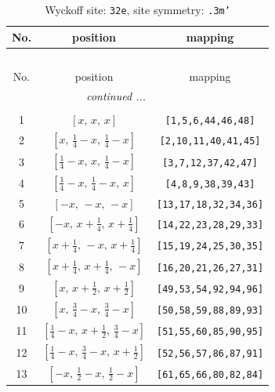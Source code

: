 \documentclass[fleqn,8pt]{jsarticle}
\begin{document}
\begin{longtable}{ccc}
\caption{Wyckoff site: {\tt 32e}, site symmetry: {\tt .3m'}}
 \\
 \hline \hline
No. & position & mapping \\ \hline \endfirsthead

\multicolumn{2}{l}{\tablename\ \thetable{}} \\
 \hline \hline
No. & position & mapping \\ \hline \endhead

 \hline \hline
\multicolumn{2}{r}{\footnotesize\it continued ...} \\ \endfoot

 \hline \hline
\multicolumn{2}{r}{} \\ \endlastfoot

1 & $\left[ x,\, x,\, x \right]$ & {\tt [1,5,6,44,46,48]} \\ \hline
2 & $\left[ x,\, \frac{1}{4} - x,\, \frac{1}{4} - x \right]$ & {\tt [2,10,11,40,41,45]} \\ \hline
3 & $\left[ \frac{1}{4} - x,\, x,\, \frac{1}{4} - x \right]$ & {\tt [3,7,12,37,42,47]} \\ \hline
4 & $\left[ \frac{1}{4} - x,\, \frac{1}{4} - x,\, x \right]$ & {\tt [4,8,9,38,39,43]} \\ \hline
5 & $\left[ - x,\, - x,\, - x \right]$ & {\tt [13,17,18,32,34,36]} \\ \hline
6 & $\left[ - x,\, x + \frac{1}{4},\, x + \frac{1}{4} \right]$ & {\tt [14,22,23,28,29,33]} \\ \hline
7 & $\left[ x + \frac{1}{4},\, - x,\, x + \frac{1}{4} \right]$ & {\tt [15,19,24,25,30,35]} \\ \hline
8 & $\left[ x + \frac{1}{4},\, x + \frac{1}{4},\, - x \right]$ & {\tt [16,20,21,26,27,31]} \\ \hline
9 & $\left[ x,\, x + \frac{1}{2},\, x + \frac{1}{2} \right]$ & {\tt [49,53,54,92,94,96]} \\ \hline
10 & $\left[ x,\, \frac{3}{4} - x,\, \frac{3}{4} - x \right]$ & {\tt [50,58,59,88,89,93]} \\ \hline
11 & $\left[ \frac{1}{4} - x,\, x + \frac{1}{2},\, \frac{3}{4} - x \right]$ & {\tt [51,55,60,85,90,95]} \\ \hline
12 & $\left[ \frac{1}{4} - x,\, \frac{3}{4} - x,\, x + \frac{1}{2} \right]$ & {\tt [52,56,57,86,87,91]} \\ \hline
13 & $\left[ - x,\, \frac{1}{2} - x,\, \frac{1}{2} - x \right]$ & {\tt [61,65,66,80,82,84]} \\ \hline

\end{longtable}
\end{document}
